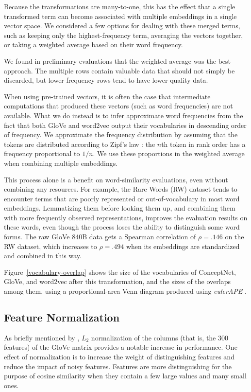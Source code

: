 \documentclass[11pt,letterpaper]{article}
\begin{document}
Because the transformations are many-to-one, this has the effect that a single
transformed term can become associated with multiple embeddings in a single
vector space. We considered a few options for dealing with these merged terms,
such as keeping only the highest-frequency term, averaging the vectors together,
or taking a weighted average based on their word frequency.

We found in preliminary evaluations that the weighted average was the best
approach. The multiple rows contain valuable data that should not simply be
discarded, but lower-frequency rows tend to have lower-quality data.

When using pre-trained vectors, it is often the case that intermediate
computations that produced these vectors (such as word frequencies) are not
available. What we do instead is to infer approximate word frequencies from
the fact that both GloVe and word2vec output their vocabularies in descending
order of frequency. We approximate the frequency distribution by assuming that
the tokens are distributed according to Zipf's law \cite{zipf1949human}: the
$n$th token in rank order has a frequency proportional to $1/n$. We use these
proportions in the weighted average when combining multiple embeddings.

This process alone is a benefit on word-similarity evaluations, even without
combining any resources. For example, the Rare Words (RW) dataset
\cite{luong2013rw} tends to encounter terms that are poorly represented or
out-of-vocabulary in most word embeddings.  Lemmatizing them before looking
them up, and combining them with more frequently observed representations,
improves the evaluation results on these words, even though the process
loses the ability to distinguish some word forms. The raw GloVe 840B data gets
a Spearman correlation of $\rho = .146$ on the RW dataset, which increases to
$\rho = .494$ when its embeddings are standardized and combined in this way.

Figure~\ref{vocabulary-overlap} shows the size of the vocabularies of
ConceptNet, GloVe, and word2vec after this transformation, and the sizes of
the overlaps among them, using a proportional-area Venn diagram produced using
{\em eulerAPE} \cite{micallef2014euler}.

\subsection{Feature Normalization}

As briefly mentioned by , $L_2$ normalization of
the columns (that is, the 300 features) of the GloVe matrix provides a notable
increase in performance. One effect of normalization is to increase the weight
of distinguishing features and reduce the impact of noisy features.  Features
are more distinguishing for the purpose of cosine similarity when they contain
a few large values and many small ones.
\end{document}
